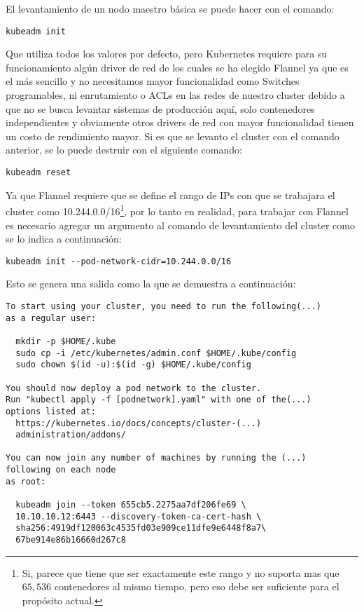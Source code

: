 El levantamiento de un nodo maestro básica se puede hacer con el comando:
    \begin{lstlisting}
kubeadm init
    \end{lstlisting}
Que utiliza todos los valores por defecto, pero Kubernetes requiere para su funcionamiento algún driver de red de los cuales se ha elegido Flannel ya que es el más sencillo y no necesitamos mayor funcionalidad como Switches programables, ni enrutamiento o ACLs en las redes de nuestro cluster debido a que no se busca levantar sistemas de producción aquí, solo contenedores independientes y obviamente otros drivers de red con mayor funcionalidad tienen un costo de rendimiento mayor. Si es que se levanto el cluster con el comando anterior, se lo puede destruir con el siguiente comando: 
    \begin{lstlisting}
kubeadm reset
    \end{lstlisting}
Ya que Flannel requiere que se define el rango de IPs con que se trabajara el cluster como 10.244.0.0/16\footnote{Si, parece que tiene que ser exactamente este rango y no suporta mas que $65,536$ contenedores al mismo tiempo, pero eso debe ser suficiente para el propósito actual.}, por lo tanto en realidad, para trabajar con Flannel es necesario agregar un argumento al comando de levantamiento del cluster como se lo indica a continuación:
    \begin{lstlisting}
kubeadm init --pod-network-cidr=10.244.0.0/16
    \end{lstlisting}
Esto se genera una salida como la que se demuestra a continuación:
    \begin{lstlisting}
To start using your cluster, you need to run the following(...)
as a regular user:

  mkdir -p $HOME/.kube
  sudo cp -i /etc/kubernetes/admin.conf $HOME/.kube/config
  sudo chown $(id -u):$(id -g) $HOME/.kube/config

You should now deploy a pod network to the cluster.
Run "kubectl apply -f [podnetwork].yaml" with one of the(...)
options listed at:
  https://kubernetes.io/docs/concepts/cluster-(...)
  administration/addons/

You can now join any number of machines by running the (...)
following on each node
as root:

  kubeadm join --token 655cb5.2275aa7df206fe69 \
  10.10.10.12:6443 --discovery-token-ca-cert-hash \
  sha256:4919df120063c4535fd03e909ce11dfe9e6448f8a7\
  67be914e86b16660d267c8
    \end{lstlisting}

